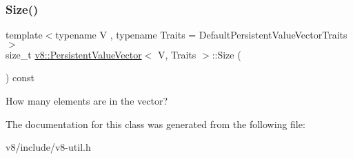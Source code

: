 \subsubsection{\texorpdfstring{Size()}{Size()}}
{\footnotesize\ttfamily template$<$typename V , typename Traits  = Default\+Persistent\+Value\+Vector\+Traits$>$ \\
size\+\_\+t \mbox{\hyperlink{classv8_1_1PersistentValueVector}{v8\+::\+Persistent\+Value\+Vector}}$<$ V, Traits $>$\+::Size (\begin{DoxyParamCaption}{ }\end{DoxyParamCaption}) const\hspace{0.3cm}{\ttfamily [inline]}}

How many elements are in the vector? 

The documentation for this class was generated from the following file\+:\begin{DoxyCompactItemize}
\item 
v8/include/v8-\/util.\+h\end{DoxyCompactItemize}
